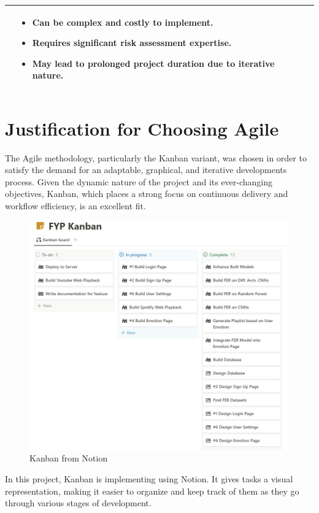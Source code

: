 \begin{table}[H]
\begin{tabularx}{\textwidth}{>{\bfseries}lXXX}
\begin{itemize}[leftmargin=*, nosep, after=\strut]
    \end{itemize} & 
    \begin{itemize}[leftmargin=*, nosep, after=\strut]
        \item Can be complex and costly to implement.
        \item Requires significant risk assessment expertise.
        \item May lead to prolonged project duration due to iterative nature.
    \end{itemize} \\
    \bottomrule
    \end{tabularx}
    \label{tab:methodologies}
\end{table}  

\section{Justification for Choosing Agile}
The Agile methodology, particularly the Kanban variant, was chosen in order to satisfy the demand for an adaptable, graphical, and iterative developments process.
Given the dynamic nature of the project and its ever-changing objectives, Kanban, which places a strong focus on continuous delivery and workflow efficiency, is an excellent fit.
\begin{figure}[H]
    \centering
    \includegraphics[width=12cm]{Images/kanban.png}
    \caption{Kanban from Notion}
    \label{fig:kanban}
\end{figure}
\indent In this project, Kanban is implementing using Notion.
It gives tasks a visual representation, making it easier to organize and keep track of them as they go through various stages of development.
